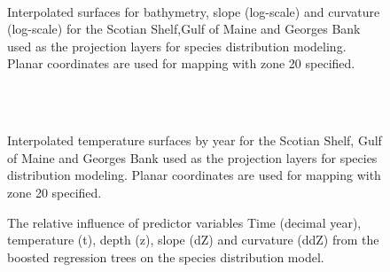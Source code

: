 \documentclass[11pt]{article}
\newcommand{\e}{/SpinDr/backup/bio_data/bio.lobster/figures/} %
\begin{document}
\begin{landscape}
\begin{figure}
\centering

   \\
    \caption{Interpolated surfaces for bathymetry, slope (log-scale) and curvature (log-scale) for the Scotian Shelf,Gulf of Maine and Georges Bank used as the projection layers for species distribution modeling. Planar coordinates are used for mapping with zone 20 specified.}
\end{figure}


\begin{figure}
\centering
   \\
    \\

\caption{Interpolated temperature surfaces by year for the Scotian Shelf, Gulf of Maine and Georges Bank used as the projection layers for species distribution modeling. Planar coordinates are used for mapping with zone 20 specified.}
\end{figure}
\end{landscape}

\begin{figure}

    \caption{The relative influence of predictor variables Time (decimal year), temperature (t), depth (z), slope (dZ) and curvature (ddZ) from the boosted regression trees on the species distribution model.}

\end{figure}
\end{document}
